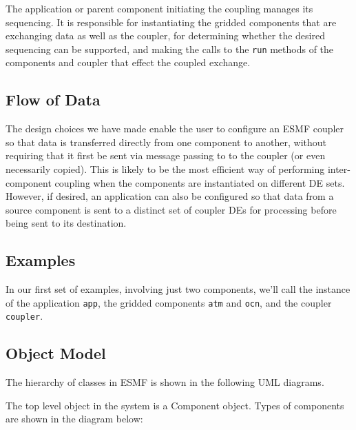 The application or parent component initiating the coupling manages 
its sequencing.  It is responsible for instantiating the gridded components
that are exchanging data as well as the coupler, for determining whether the 
desired sequencing can be supported, and making the calls to the {\tt run} 
methods of the components and coupler that effect the coupled exchange. 

\subsection{Flow of Data}

The design choices we have made enable the user to configure an ESMF
coupler so that data is transferred directly from one component to another, 
without requiring that it first be sent via message passing to to the
coupler (or even necessarily
copied).  This is likely to be the most efficient way of performing 
inter-component coupling when the components are instantiated on different
DE sets.  However, if desired, an application can also be configured so that
data from a source component is sent to a distinct set of coupler 
DEs for processing before being sent to its destination.

\subsection{Examples}

In our first set of examples, involving just two components, we'll call 
the instance of the application {\tt app}, the gridded components {\tt atm} 
and {\tt ocn}, and the coupler {\tt coupler}.

\subsection{Object Model}

The hierarchy of classes in ESMF is shown in the following UML diagrams.  

The top level object in the system is a Component object.
Types of components are shown in the diagram below:



